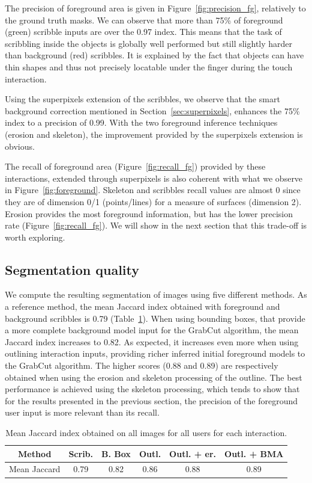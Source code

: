 The precision of foreground area is given in
Figure~\ref{fig:precision_fg}, relatively to the ground truth masks.
We can observe that more than 75\% of foreground (green)
scribble inputs are over the 0.97 index.
This means that the task of scribbling inside the objects
is globally well performed but still slightly harder
than background (red) scribbles.
It is explained by the fact that objects can have thin shapes
and thus not precisely locatable under the finger
during the touch interaction.


Using the superpixels extension of the scribbles,
we observe that the smart background correction mentioned
in Section~\ref{sec:superpixels},
enhances the 75\% index to a precision of 0.99.
With the two foreground inference techniques (erosion and skeleton),
the improvement provided by the superpixels extension is obvious.


The recall of foreground area (Figure~\ref{fig:recall_fg})
provided by these interactions, extended through superpixels is
also coherent with what we observe in Figure~\ref{fig:foreground}.
Skeleton and scribbles recall values are almost 0 since they are of
dimension 0/1 (points/lines) for a measure of surfaces (dimension 2).
Erosion provides the most foreground information,
but has the lower precision rate (Figure~\ref{fig:recall_fg}).
We will show in the next section that this trade-off is worth exploring.


\subsection{Segmentation quality}


We compute the resulting segmentation of images using five different methods.
As a reference method, the mean Jaccard index obtained with foreground
and background scribbles is 0.79 (Table~\ref{tab:jaccard}).
When using bounding boxes, that provide a more complete
background model input for the GrabCut algorithm,
the mean Jaccard index increases to 0.82.
As expected, it increases even more when using outlining interaction inputs,
providing richer inferred initial foreground models to the GrabCut algorithm.
The higher scores (0.88 and 0.89) are respectively obtained when
using the erosion and skeleton processing of the outline.
The best performance is achieved using the skeleton processing,
which tends to show that for the results presented in the previous section,
the precision of the foreground user input is more relevant than its recall.


\begin{table}[ht]
\centering
\begin{tabular}{cccccc}
Method & Scrib. & B. Box & Outl. & Outl. + er. & Outl. + BMA \\ \midrule
Mean Jaccard & 0.79 & 0.82 & 0.86 & 0.88 & 0.89 \\
\end{tabular}
\caption{Mean Jaccard index obtained on all images
for all users for each interaction.}%
\label{tab:jaccard}
\end{table}


